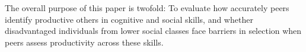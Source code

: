 \documentclass[11pt,a4paper,oneside]{article}
\begin{document}
The overall purpose of this paper is twofold: To evaluate how accurately peers identify productive others in cognitive and social skills, and whether disadvantaged individuals from lower social classes face barriers in selection when peers assess productivity across these skills.




\end{document}
